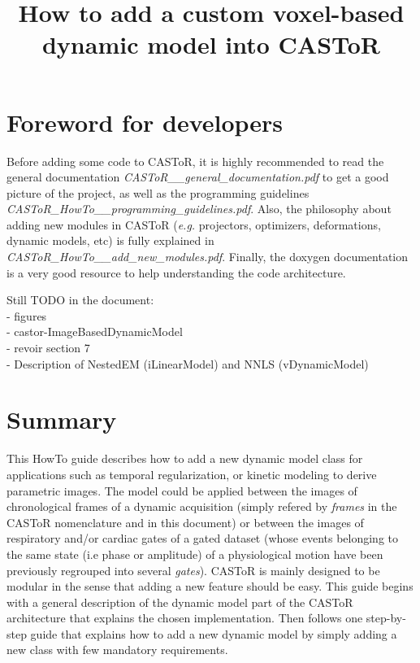 \documentclass[a4paper, 11pt]{article}
\begin{document}
\title{How to add a custom voxel-based dynamic model into CASToR}
\maketitle

\section*{Foreword for developers}

Before adding some code to CASToR, it is highly recommended to read the general documentation \textit{CASToR\_\_general\_documentation.pdf} to get a good
picture of the project, as well as the programming guidelines \textit{CASToR\_HowTo\_\_programming\_guidelines.pdf}. Also, the philosophy about adding new
modules in CASToR (\textit{e.g.} projectors, optimizers, deformations, dynamic models, etc) is fully explained in \textit{CASToR\_HowTo\_\_add\_new\_modules.pdf}.
Finally, the doxygen documentation is a very good resource to help understanding the code architecture.

\color{red}
Still TODO in the document:\\
- figures\\
- castor-ImageBasedDynamicModel\\
- revoir section 7\\
- Description of NestedEM (iLinearModel) and NNLS (vDynamicModel)
\color{black}

\section{Summary}

This HowTo guide describes how to add a new dynamic model class for applications such as temporal regularization, or kinetic modeling to derive parametric images. The model could be applied between the images of chronological frames of a dynamic acquisition (simply refered by \textit{frames} in the CASToR nomenclature and in this document) or between the images of respiratory and/or cardiac gates of a gated dataset (whose events belonging to the same state (i.e phase or amplitude) of a physiological motion have been previously regrouped into several \textit{gates}). CASToR is mainly designed to be modular in the sense that adding a new feature should be easy. This guide begins with a general description of the dynamic model part of the CASToR architecture that explains the chosen implementation. Then follows one step-by-step guide that explains how to add a new dynamic model by simply adding a new class with few mandatory requirements.
\end{document}
